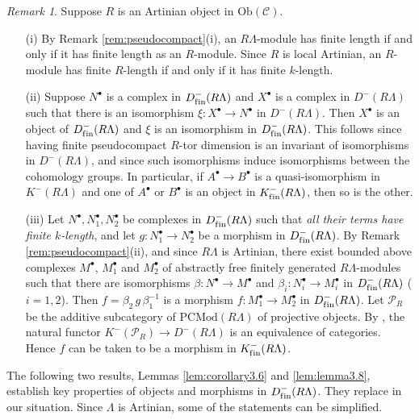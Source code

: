 \documentclass{amsart}
\theoremstyle{plain}
\theoremstyle{definition}
\theoremstyle{remark}
\newtheorem{rem}[thm]{Remark}
\begin{document}
\begin{rem}
\label{rem:whatever}
Suppose $R$ is an Artinian object in $\mathrm{Ob}(\mathcal {C})$.
\begin{enumerate}
\item[(i)]
By Remark \ref{rem:pseudocompact}(i), an $R\Lambda$-module has finite
length if and only if it has finite length as an $R$-module.
Since $R$ is local Artinian, an $R$-module has finite $R$-length if 
and only if it has finite $k$-length. 
\item[(ii)] Suppose $N^\bullet$ is a complex in $D^-_{\mathrm{f\/in}}(R\Lambda)$ and
$X^\bullet$ is a complex in $D^-(R\Lambda)$ such that there is an isomorphism
$\xi:X^\bullet \to N^\bullet$ in $D^-(R\Lambda)$. Then $X^\bullet$ is an object of
$D^-_{\mathrm{f\/in}}(R\Lambda)$ and $\xi$ is an isomorphism in $D^-_{\mathrm{f\/in}}(R\Lambda)$. This follows
since having finite pseudocompact $R$-tor dimension is an invariant of isomorphisms in
$D^-(R\Lambda)$, and since such isomorphisms induce isomorphisms between
the cohomology groups. In particular, if $A^\bullet\to B^\bullet$ is a quasi-isomorphism
in $K^-(R\Lambda)$ and one of $A^\bullet$ or $B^\bullet$ is an object in $K^{-}_{\mathrm{f\/in}}(R\Lambda)$,
then so is the other.
\item[(iii)]
Let $N^\bullet,N_1^\bullet,N_2^\bullet$ be complexes in $D^-_{\mathrm{f\/in}}(R\Lambda)$ 
such that \textit{all their terms have finite $k$-length}, and let $g:N_1^\bullet\to N_2^\bullet$ be a
morphism in $D^{-}_{\mathrm{f\/in}}(R\Lambda)$. By Remark \ref{rem:pseudocompact}(ii), and 
since  $R\Lambda$ is Artinian,
there exist  bounded above complexes $M^\bullet$, $M_1^\bullet$ and 
$M_2^\bullet$ of abstractly free finitely generated $R\Lambda$-modules such that there
are isomorphisms $\beta:N^\bullet\to M^\bullet$ and
$\beta_i: N_i^\bullet\to M_i^\bullet$ in $D^{-}_{\mathrm{f\/in}}(R\Lambda)$ ($i=1,2$). 
Then $f=\beta_2\,g\,\beta_1^{-1}$ is a 
morphism $f:M_1^\bullet \to M_2^\bullet$ in $D^{-}_{\mathrm{f\/in}}(R\Lambda)$.
Let $\mathcal{P}_R$ be the additive subcategory of $\mathrm{PCMod}(R\Lambda)$ of 
projective objects.
By  \cite[Thm. 10.4.8]{Weibel}, the natural functor $K^-(\mathcal{P}_R)
\to D^-(R\Lambda)$ is an equivalence of categories. Hence $f$
can be taken to be a morphism in $K^{-}_{\mathrm{f\/in}}(R\Lambda)$. 
\end{enumerate}
\end{rem}

The following two results, Lemmas \ref{lem:corollary3.6} and \ref{lem:lemma3.8},
establish key properties of objects and morphisms in $D^{-}_{\mathrm{f\/in}}(R\Lambda)$.
They replace \cite[Cor. 3.6 and Lemma 3.8]{bcderived} in our situation. Since
$\Lambda$ is Artinian, some of the statements can be simplified.
\end{document}
